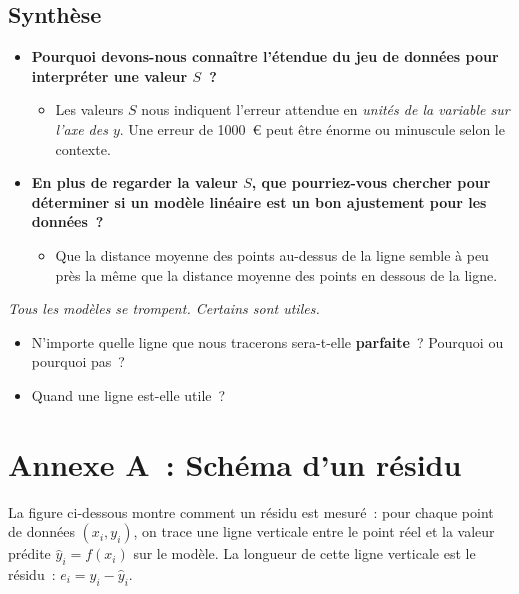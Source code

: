 \documentclass[12pt,a4paper]{article}
\begin{document}
\subsection{Synthèse}

\begin{thinkbox}
  \begin{itemize}
    \item \textbf{Pourquoi devons-nous connaître l'étendue du jeu de données pour interpréter une valeur $S$~?}
    \begin{itemize}
      \item Les valeurs $S$ nous indiquent l'erreur attendue en \emph{unités de la variable sur l'axe des $y$}. Une erreur de 1000~€ peut être énorme ou minuscule selon le contexte.
    \end{itemize}
    \item \textbf{En plus de regarder la valeur $S$, que pourriez-vous chercher pour déterminer si un modèle linéaire est un bon ajustement pour les données~?}
    \begin{itemize}
      \item Que la distance moyenne des points au-dessus de la ligne semble à peu près la même que la distance moyenne des points en dessous de la ligne.
    \end{itemize}
  \end{itemize}
\end{thinkbox}

\begin{keypointbox}
  \emph{Tous les modèles se trompent. Certains sont utiles.}

  \begin{itemize}
    \item N'importe quelle ligne que nous tracerons sera-t-elle \textbf{parfaite}~? Pourquoi ou pourquoi pas~?
    \item Quand une ligne est-elle utile~?
  \end{itemize}
\end{keypointbox}

\newpage

\section*{Annexe A~: Schéma d'un résidu}

La figure ci-dessous montre comment un résidu est mesuré~: pour chaque point de données $(x_i, y_i)$, on trace une ligne verticale entre le point réel et la valeur prédite $\hat{y}_i = f(x_i)$ sur le modèle. La longueur de cette ligne verticale est le résidu~: $e_i = y_i - \hat{y}_i$.
\end{document}
